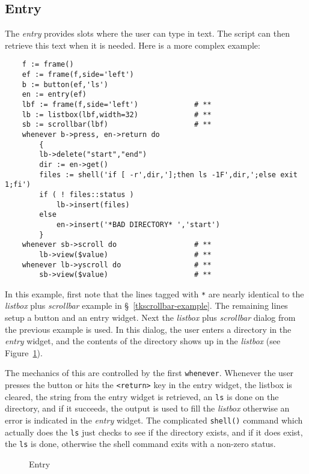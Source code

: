 \subsection{Entry}
The {\em entry} provides slots where the user can type in text. The script
can then retrieve this text when it is needed. Here is a more complex example:
\begin{verbatim}
    f := frame()
    ef := frame(f,side='left')
    b := button(ef,'ls')
    en := entry(ef)
    lbf := frame(f,side='left')             # **
    lb := listbox(lbf,width=32)             # **
    sb := scrollbar(lbf)                    # **
    whenever b->press, en->return do
        {
        lb->delete("start","end")
        dir := en->get()
        files := shell('if [ -r',dir,'];then ls -1F',dir,';else exit 1;fi')
        if ( ! files::status )
            lb->insert(files)
        else
            en->insert('*BAD DIRECTORY* ','start')
        }
    whenever sb->scroll do                  # **
        lb->view($value)                    # **
    whenever lb->yscroll do                 # **
        sb->view($value)                    # **
\end{verbatim}
In this example, first note that the lines tagged with {\tt **} are nearly
identical to the {\em listbox} plus {\em scrollbar} example in
\S~\ref{tkscrollbar-example}. The remaining lines setup a button and an entry
widget. Next the {\em listbox} plus {\em scrollbar} dialog from the
previous example is used. In this dialog, the user enters a directory in the
{\em entry} widget, and the contents of the directory  shows up in the
{\em listbox} (see Figure~\ref{tkentry}).

The mechanics of this are controlled by the first
{\tt whenever}. Whenever the user presses the button or hits the
\verb+<return>+ key in the entry widget, the listbox is cleared, the string
from the entry widget is retrieved, an {\tt ls} is done on the directory, and if it
succeeds, the output is used to fill the {\em listbox} otherwise an error is
indicated in the {\em entry} widget. The complicated \verb+shell()+ command which
actually does the {\tt ls} just checks to see if the directory exists, and if
it does exist, the {\tt ls} is done, otherwise the shell command exits with a
non-zero status.

\begin{figure}[thb]
\centerline{}
\caption{ Entry }
\label{tkentry}
\end{figure}

